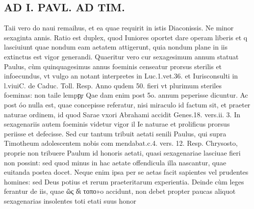 \documentclass{article}
\begin{document}
\begin{pages}
\section*{AD I. PAVL. AD TIM. }
\marginpar{[ p.274 ]}\pstart Taii vero do naui remaihus, et ea quae requirit in istis Diaconissis.  \pend\pstart Ne minor sexaginta annis. Ratio est duplex, quod Iuniores oportet dare operam liberis et q lasciuiunt quae nondum eam aetatem attigerunt, quia nondum plane in iis extinctus est vigor generandi. Quaeritur vero cur sexagesimum annum statuat Paulus, cùm quinquagesimus annus foeminis censeatur prorsus sterilis et infoecundus, vt vulgo an notant interpretes in Luc.1.vet.36. et Iurisconsulti in l.viuiC. de Caduc. Toll. Resp. Anno qudem 50. fieri vt plurimum steriles foeminas: non taile lempp̧r Qae dam enim post 5o. annum peperisse dicuntur. Ac post óo nulla est, quae concepisse referatur, nisi miraculo id factum sit, et praeter naturae ordinem, id quod Sarae vxori Abrahami accidit Genes.18. vers.ii. 3.  \pend\pstart In sexagenariis autem foeminis videtur vigor il Ie naturae et prolificus prorsus periisse et defecisse.  \pend\pstart Sed cur tantum tribuit aetati senili Paulus, qui supra Timotheum adolescentem nobis com mendabat.c.4. vers. 12. Resp. Chrysosto, proprie non tribuere Paulum id honoris aetati, quasi sexagenariae lasciuae fieri non possint: sed quod minus in hac aetate offendicula illa nascantur, quae euitanda postea docet. Neque enim ipsa per se aetas facit sapientes vel prudentes homines: sed Deus potius et rerum praeteritarum experientia. Deinde cùm leges ferantur de iis, quae ὥς δ̓ι τοπο»o accidunt, non debet propter paucas aliquot sexagenarias insolentes toti etati suus honor  \pend

\end{pages}
\end{document}

